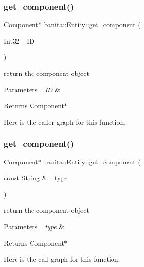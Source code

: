 \subsubsection{\texorpdfstring{get\_component()}{get\_component()}\hspace{0.1cm}{\footnotesize\ttfamily [1/2]}}
{\footnotesize\ttfamily \mbox{\hyperlink{classbanita_1_1_component}{Component}}$\ast$ banita\+::\+Entity\+::get\+\_\+component (\begin{DoxyParamCaption}\item[{Int32}]{\+\_\+\+ID }\end{DoxyParamCaption})\hspace{0.3cm}{\ttfamily [inline]}}



return the component object 


\begin{DoxyParams}{Parameters}
{\em \+\_\+\+ID} & \\
\hline
\end{DoxyParams}
\begin{DoxyReturn}{Returns}
Component$\ast$ 
\end{DoxyReturn}
Here is the caller graph for this function\+:
\mbox{\label{classbanita_1_1_entity_aa8fbd735440d40b2a934828aa5e726d6}} 
\subsubsection{\texorpdfstring{get\_component()}{get\_component()}\hspace{0.1cm}{\footnotesize\ttfamily [2/2]}}
{\footnotesize\ttfamily \mbox{\hyperlink{classbanita_1_1_component}{Component}}$\ast$ banita\+::\+Entity\+::get\+\_\+component (\begin{DoxyParamCaption}\item[{const String \&}]{\+\_\+type }\end{DoxyParamCaption})\hspace{0.3cm}{\ttfamily [inline]}}



return the component object 


\begin{DoxyParams}{Parameters}
{\em \+\_\+type} & \\
\hline
\end{DoxyParams}
\begin{DoxyReturn}{Returns}
Component$\ast$ 
\end{DoxyReturn}
Here is the call graph for this function\+:
\mbox{\label{classbanita_1_1_entity_aa270c75c0dead62a45a39e4b2b016988}} 
